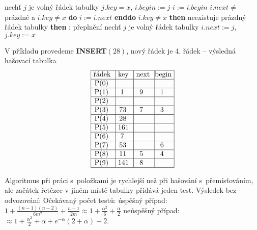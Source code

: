 \documentclass[a4paper,12pt]{article}
\begin{document}
\phantom{------}{\bf else}\newline 
\phantom{---------}nechť $j$ je volný řádek tabulky\newline 
\phantom{---------}$j.key=x$, $i.begin:=j$\newline 
\phantom{------}{\bf endif}\newline 
\phantom{---}{\bf endif\newline 
else}\newline 
\phantom{---}$i:=i.begin$\newline
\phantom{---}{\bf while} $i.next\ne$prázdné a $i.key\ne x$ {\bf do} $i:=i.next$ {\bf enddo}\newline 
\phantom{---}{\bf if} $i.key\ne x$ {\bf then}\newline 
\phantom{------}{\bf if} neexistuje prázdný řádek tabulky {\bf then}\newline 
\phantom{---------}{\bf Výstup}: přeplnění\newline 
\phantom{------}{\bf else}\newline 
\phantom{---------}nechť $j$ je volný řádek tabulky\newline 
\phantom{---------}$i.next:=j$, $j.key:=x$\newline 
\phantom{------}{\bf endif}\newline 
\phantom{---}{\bf endif\newline 
endif}


V příkladu provedeme {\bf INSERT$(28)$}, nový řádek je 4. 
řádek\newline 
-- výsledná hašovací tabulka
$$\vtop{\offinterlineskip\halign {\strut\vrule\ # & \vrule\ # & \vrule\ # & \vrule \hfil # \hfil \vrule\cr\noalign{\hrule}řádek & key & next & begin\hfil \cr\noalign{\hrule}P(0) & & &\hfill \cr\noalign{\hrule}P(1) & 1 & 9 & 1 \cr\noalign{\hrule}P(2) & & &\hfill \cr\noalign{\hrule}P(3) & 73 & 7 & 3 \cr\noalign{\hrule}P(4) & 28 &  &\hfill \cr\noalign{\hrule}P(5) & 161 & & \hfill \cr\noalign{\hrule}P(6) & 7 & &\hfill \cr\noalign{\hrule}P(7) & 53 & & 6 \cr\noalign{\hrule}P(8) & 11 & 5 & 4  \cr\noalign{\hrule}P(9) & 141 & 8 & \hfill \cr\noalign{\hrule}}}$$

Algoritmus při práci s~položkami je rychlejší než při 
hašování s~přemísťováním, ale začátek řetězce v 
jiném místě tabulky přidává jeden test. Výsledek bez 
odvozování:\newline 
Očekávaný počet testů:\newline 
\phantom{---}úspěšný případ: $1+\frac {(n-1)(n-2
)}{6m^2}+\frac {n-1}{2m}\approx 1+\frac {\alpha^2}6+\frac {\alpha}
2$\newline 
\phantom{---}neúspěšný případ: $\approx 1+\frac {
\alpha^2}2+\alpha +e^{-\alpha}(2+\alpha )-2$.
\end{document}
